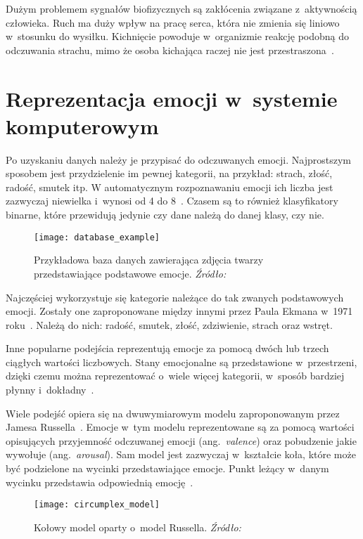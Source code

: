 Dużym problemem sygnałów biofizycznych są zakłócenia związane z~aktywnością człowieka.
Ruch ma duży wpływ na pracę serca, która nie zmienia się liniowo w~stosunku do wysiłku.
Kichnięcie powoduje w~organizmie reakcję podobną do odczuwania strachu, mimo że osoba kichająca raczej nie jest przestraszona~\cite{Calvo2015}.


\section{Reprezentacja emocji w~systemie komputerowym}\label{sec:reprezentacja-emocji-w-systemie-komputerowym}

Po uzyskaniu danych należy je przypisać do odczuwanych emocji.
Najprostszym sposobem jest przydzielenie im pewnej kategorii, na przykład: strach, złość, radość, smutek itp.
W automatycznym rozpoznawaniu emocji ich liczba jest zazwyczaj niewielka i~wynosi od 4 do 8~\cite{Dzedzickis2020}.
Czasem są to również klasyfikatory binarne, które przewidują jedynie czy dane należą do danej klasy, czy nie.

\begin{figure}[h]
    \centering
    \texttt{[image: database\_example]}
    \caption{Przykładowa baza danych zawierająca zdjęcia twarzy przedstawiające podstawowe emocje. \textit{Źródło:~\cite{Li2017}}}
    \label{fig:database-example}
\end{figure}

Najczęściej wykorzystuje się kategorie należące do tak zwanych podstawowych emocji.
Zostały one zaproponowane między innymi przez Paula Ekmana w~1971 roku~\cite{Ekman1971}.
Należą do nich: radość, smutek, złość, zdziwienie, strach oraz wstręt.

Inne popularne podejścia reprezentują emocje za pomocą dwóch lub trzech ciągłych wartości liczbowych.
Stany emocjonalne są przedstawione w~przestrzeni, dzięki czemu można reprezentować o~wiele więcej kategorii, w~sposób bardziej płynny i~dokładny~\cite{Calvo2015}.

Wiele podejść opiera się na dwuwymiarowym modelu zaproponowanym przez Jamesa Russella~\cite{Russell1980}.
Emocje w~tym modelu reprezentowane są za pomocą wartości opisujących przyjemność odczuwanej emocji (ang.~\textit{valence}) oraz pobudzenie jakie wywołuje (ang.~\textit{arousal}).
Sam model jest zazwyczaj w~kształcie koła, które może być podzielone na wycinki przedstawiające emocje.
Punkt leżący w~danym wycinku przedstawia odpowiednią emocję~\cite{Dzedzickis2020}.

\begin{figure}[h]
    \centering
    \texttt{[image: circumplex\_model]}
    \caption{Kołowy model oparty o~model Russella. \textit{Źródło:~\cite{Dzedzickis2020}}}
    \label{fig:circumplex-model}
\end{figure}


